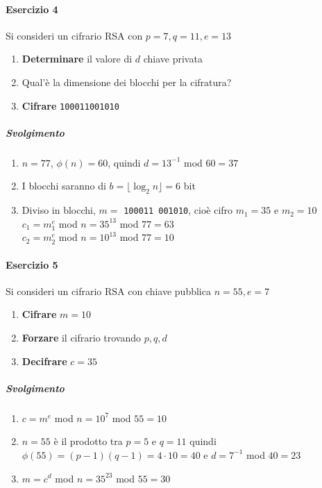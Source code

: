 \documentclass[10pt]{book}
\begin{document}
\paragraph{Esercizio 4} Si consideri un cifrario RSA con $p = 7, q = 11, e = 13$
\begin{enumerate}
	\item \textbf{Determinare} il valore di $d$ chiave privata
	\item Qual'è la dimensione dei blocchi per la cifratura?
	\item \textbf{Cifrare} \texttt{100011001010}
\end{enumerate}
\subparagraph{Svolgimento} \begin{enumerate}
	\item $n = 77$, $\phi(n) = 60$, quindi $d = 13^{-1}$ mod $60 = 37$
	\item I blocchi saranno di $b = \lfloor\log_2 n\rfloor = 6$ bit
	\item Diviso in blocchi, $m =$ \texttt{100011 001010}, cioè cifro $m_1 = 35$ e $m_2 = 10$\\
	$c_1 = m_1^e$ mod $n = 35^{13}$ mod $77 = 63$\\
	$c_2 = m_2^e$ mod $n = 10^{13}$ mod $77 = 10$
\end{enumerate}
\paragraph{Esercizio 5} Si consideri un cifrario RSA con chiave pubblica $n = 55, e = 7$
\begin{enumerate}
	\item \textbf{Cifrare} $m = 10$
	\item \textbf{Forzare} il cifrario trovando $p,q,d$
	\item \textbf{Decifrare} $c = 35$
\end{enumerate}
\subparagraph{Svolgimento} \begin{enumerate}
	\item $c = m^e$ mod $n = 10^7$ mod $55 = 10$
	\item $n = 55$ è il prodotto tra $p = 5$ e $q = 11$ quindi $\phi(55) = (p-1)(q-1) = 4\cdot 10 = 40$ e $d = 7^{-1}$ mod $40 = 23$
	\item $m = c^d$ mod $n = 35^{23}$ mod $55 = 30$
\end{enumerate}
\pagebreak
\end{document}
